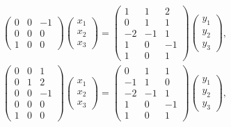 \documentclass[12pt]{article}
\begin{document}
\begin{enumerate}
\begin{gather*}
\begin{pmatrix}
                0 & 0 & -1 \\
                0 & 0 & 0  \\
                1 & 0 & 0
            \end{pmatrix}
            \begin{pmatrix}
                x_1 \\ x_2 \\ x_3
            \end{pmatrix}
            =
            \begin{pmatrix}
                1  & 1  & 2  \\
                0  & 1  & 1  \\
                -2 & -1 & 1  \\
                1  & 0  & -1 \\
                1  & 0  & 1
            \end{pmatrix}
            \begin{pmatrix}
                y_1 \\ y_2 \\ y_3
            \end{pmatrix} , \\
            \begin{pmatrix}
                0 & 0 & 1  \\
                0 & 1 & 2  \\
                0 & 0 & -1 \\
                0 & 0 & 0  \\
                1 & 0 & 0
            \end{pmatrix}
            \begin{pmatrix}
                x_1 \\ x_2 \\ x_3
            \end{pmatrix}
            =
            \begin{pmatrix}
                0  & 1  & 1  \\
                -1 & 1  & 0  \\
                -2 & -1 & 1  \\
                1  & 0  & -1 \\
                1  & 0  & 1
            \end{pmatrix}
            \begin{pmatrix}
                y_1 \\ y_2 \\ y_3
            \end{pmatrix} , \\

\end{gather*}
\end{enumerate}
\end{document}
